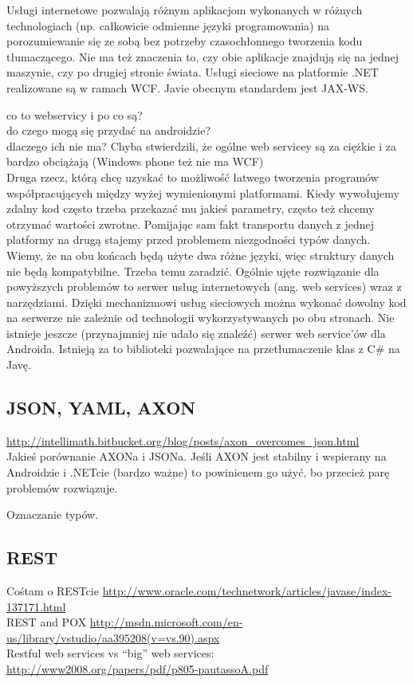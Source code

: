 Usługi internetowe pozwalają różnym aplikacjom wykonanych w różnych technologiach (np. całkowicie odmienne języki programowania) na porozumiewanie się ze sobą bez potrzeby czasochłonnego tworzenia kodu tłumaczącego. Nie ma też znaczenia to, czy obie aplikacje znajdują się na jednej maszynie, czy po drugiej stronie świata.
Usługi sieciowe na platformie .NET realizowane są w ramach WCF. Javie obecnym standardem jest JAX-WS.

co to webservicy i po co są?\\
do czego mogą się przydać na androidzie?\\
dlaczego ich nie ma? Chyba stwierdzili, że ogólne web servicey są za ciężkie i za bardzo obciążają (Windows phone też nie ma WCF)\\

Druga rzecz, którą chcę uzyskać to możliwość łatwego tworzenia programów współpracujących między wyżej wymienionymi platformami. Kiedy wywołujemy zdalny kod często trzeba przekazać mu jakieś parametry, często też chcemy otrzymać wartości zwrotne. Pomijając sam fakt transportu danych z jednej platformy na drugą stajemy przed problemem niezgodności typów danych. Wiemy, że na obu końcach będą użyte dwa różne języki, więc struktury danych nie będą kompatybilne. Trzeba temu zaradzić.
Ogólnie ujęte rozwiązanie dla powyższych problemów to serwer usług internetowych (ang. web services) wraz z narzędziami. Dzięki mechanizmowi usług sieciowych można wykonać dowolny kod na serwerze nie zależnie od technologii wykorzystywanych po obu stronach. Nie istnieje jeszcze (przynajmniej nie udało się znaleźć) serwer web service’ów dla Androida. Istnieją za to biblioteki pozwalające na przetłumaczenie klas z C\# na Javę.

\subsection{JSON, YAML, AXON}
\url{http://intellimath.bitbucket.org/blog/posts/axon_overcomes_json.html}\\
Jakieś porównanie AXONa i JSONa. Jeśli AXON jest stabilny i wspierany na Androidzie i .NETcie (bardzo ważne) to powinienem go użyć, bo przecież parę problemów rozwiązuje.

Oznaczanie typów.

\subsection{REST}
Cośtam o RESTcie \url{http://www.oracle.com/technetwork/articles/javase/index-137171.html}\\
REST and POX \url{http://msdn.microsoft.com/en-us/library/vstudio/aa395208(v=vs.90).aspx}\\

Restful web services vs ``big'' web services: \url{http://www2008.org/papers/pdf/p805-pautassoA.pdf}\\